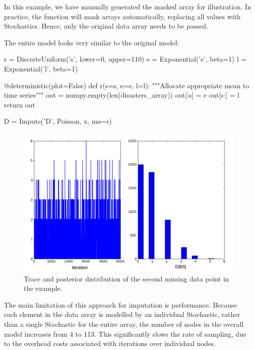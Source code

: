 \documentclass[]{jss}
\begin{document}
In this example, we have manually generated the masked array for illustration. In practice, the  function will mask arrays automatically, replacing all  values with Stochastics. Hence, only the original data array needs to be passed.

The entire model looks very similar to the original model:

\begin{CodeInput}
s = DiscreteUniform('s', lower=0, upper=110)
e = Exponential('e', beta=1)
l = Exponential('l', beta=1)

@deterministic(plot=False)
def r(s=s, e=e, l=l):
    """Allocate appropriate mean to time series"""
    out = numpy.empty(len(disasters_array))
    out[:s] = e
    out[s:] = l
    return out

D = Impute('D', Poisson, x, mu=r)
\end{CodeInput}

\begin{figure}[ht]
\begin{center}
\includegraphics[width=15cm]{missing.pdf}
\caption{Trace and posterior distribution of the second missing data point in the example.}
\label{fig:missing}
\end{center}
\end{figure}


The main limitation of this approach for imputation is performance. Because each
element in the data array is modelled by an individual Stochastic, rather than a
single Stochastic for the entire array, the number of nodes in the overall model
increases from 4 to 113. This significantly slows the rate of sampling, due to
the overhead costs associated with iterations over individual nodes.
\end{document}
